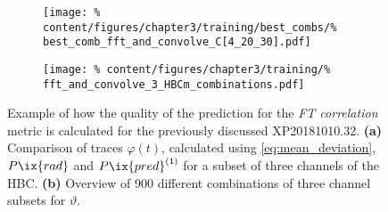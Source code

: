                 \begin{figure}[t]%
                    \centering%
                    \begin{subfigure}{0.43\textwidth}%
                        \texttt{[image: \%
                            content/figures/chapter3/training/best\_combs/\%
                            best\_comb\_fft\_and\_convolve\_C[4\_20\_30].pdf]}%
                        \caption{}%
                    \end{subfigure}%
                    \hfill%
                    \begin{subfigure}{0.47\textwidth}%
                        \texttt{[image: \%
                            content/figures/chapter3/training/\%
                            fft\_and\_convolve\_3\_HBCm\_combinations.pdf]}%
                        \caption{}%
                    \end{subfigure}%
                    \caption{Example of how the quality of the prediction for the \textit{FT correlation} metric is calculated for the previously discussed XP20181010.32. \textbf{(a)} Comparison of traces $\varphi\left(t\right)$, calculated using \cref{eq:mean_deviation}, $P\ix{rad}$ and $P\ix{pred}^{\left(1\right)}$ for a subset of three channels of the HBC. \textbf{(b)} Overview of 900 different combinations of three channel subsets for $\vartheta$.}\label{fig:fourier_correlation}%
                \end{figure}%
%
